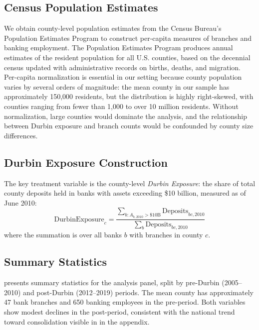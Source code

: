 \documentclass[12pt]{article}
\begin{document}
\subsection{Census Population Estimates}

We obtain county-level population estimates from the Census Bureau's Population Estimates Program to construct per-capita measures of branches and banking employment. The Population Estimates Program produces annual estimates of the resident population for all U.S. counties, based on the decennial census updated with administrative records on births, deaths, and migration. Per-capita normalization is essential in our setting because county population varies by several orders of magnitude: the mean county in our sample has approximately 150,000 residents, but the distribution is highly right-skewed, with counties ranging from fewer than 1,000 to over 10 million residents. Without normalization, large counties would dominate the analysis, and the relationship between Durbin exposure and branch counts would be confounded by county size differences.

\subsection{Durbin Exposure Construction}

The key treatment variable is the county-level \textit{Durbin Exposure}: the share of total county deposits held in banks with assets exceeding \$10 billion, measured as of June 2010:
\begin{equation}
\text{DurbinExposure}_c = \frac{\sum_{b: A_{b,2010} > \$10\text{B}} \text{Deposits}_{bc,2010}}{\sum_b \text{Deposits}_{bc,2010}}
\end{equation}
where the summation is over all banks $b$ with branches in county $c$.

\subsection{Summary Statistics}



 presents summary statistics for the analysis panel, split by pre-Durbin (2005--2010) and post-Durbin (2012--2019) periods. The mean county has approximately 47 bank branches and 650 banking employees in the pre-period. Both variables show modest declines in the post-period, consistent with the national trend toward consolidation visible in  in the appendix.
\end{document}
